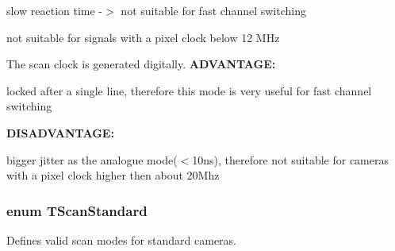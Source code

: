 \begin{Desc}
\begin{description}
\begin{DoxyItemize}
\item slow reaction time -\/$>$ not suitable for fast channel switching
\item not suitable for signals with a pixel clock below 12 M\+Hz 
\end{DoxyItemize}\item[{\em 
\hypertarget{group___device_specific_interface_ggaeb51ae9af79746e86fa53a85691fd043a3c86d0441a3b5c1654f6eeb5033655f9}{sc\+Digital}\label{group___device_specific_interface_ggaeb51ae9af79746e86fa53a85691fd043a3c86d0441a3b5c1654f6eeb5033655f9}
}]The scan clock is generated digitally. {\bfseries A\+D\+V\+A\+N\+T\+A\+G\+E\+:} ~\newline

\begin{DoxyItemize}
\item locked after a single line, therefore this mode is very useful for fast channel switching
\end{DoxyItemize}

{\bfseries D\+I\+S\+A\+D\+V\+A\+N\+T\+A\+G\+E\+:} ~\newline

\begin{DoxyItemize}
\item bigger jitter as the analogue mode($<$10ns), therefore not suitable for cameras with a pixel clock higher then about 20\+Mhz 
\end{DoxyItemize}\end{description}
\end{Desc}
\hypertarget{group___device_specific_interface_ga7a78489f39d4e77dd06dd7cee5c40de0}{
\subsubsection[{T\+Scan\+Standard}]{\setlength{\rightskip}{0pt plus 5cm}enum {\bf T\+Scan\+Standard}}}\label{group___device_specific_interface_ga7a78489f39d4e77dd06dd7cee5c40de0}


Defines valid scan modes for standard cameras. 

